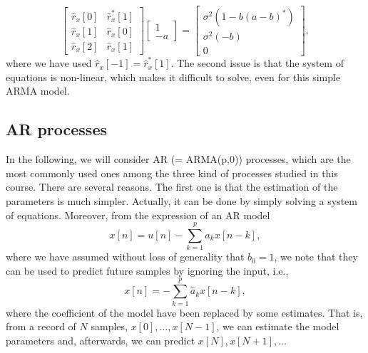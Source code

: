 \begin{example}
\begin{equation}
	\begin{bmatrix}
	\hat{r}_x[0] & \hat{r}_x^{\ast}[1] \\
	\hat{r}_x[1] & \hat{r}_x[0] \\
	\hat{r}_x[2] & \hat{r}_x[1] 
\end{bmatrix}
\begin{bmatrix}
	1 \\ -a
\end{bmatrix} = 
\begin{bmatrix}
	\sigma^2 \left(1 - b (a-b)^{\ast}\right) \\
	\sigma^2  (-b) \\
	0
\end{bmatrix},
\end{equation}
where we have used $\hat{r}_x[-1] = \hat{r}_x^{\ast}[1]$. The second issue is that the system of equations is non-linear, which makes it difficult to solve, even for this simple ARMA model.
\end{example}

\subsection{AR processes}

In the following, we will consider AR (= ARMA(p,0)) processes, which are the most commonly used ones among the three kind of processes studied in this course. There are several reasons. The first one is that the estimation of the parameters is much simpler. Actually, it can be done by simply solving a system of equations. Moreover, from the expression of an AR model
\begin{equation}
\label{eq:signal_model_AR}
x[n]  = u[n] - \sum_{k = 1}^{p} a_k x[n -k],
\end{equation}
where we have assumed without loss of generality that $b_0 = 1$, we note that they can be used to predict future samples by ignoring the input, i.e.,
\begin{equation}
\label{eq:linear_prediction}
x[n]  =  - \sum_{k = 1}^{p} \hat{a}_k x[n -k],
\end{equation}
where the coefficient of the model have been replaced by some estimates. That is, from a record of $N$ samples, $x[0], \ldots, x[N-1]$, we can estimate the model parameters and, afterwards, we can predict $x[N], x[N+1], \ldots$

